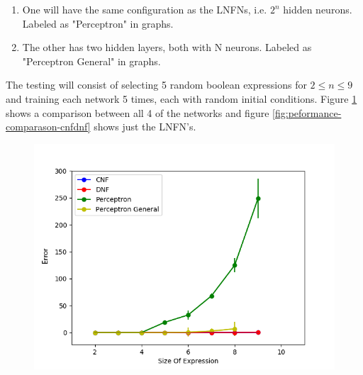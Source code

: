 \begin{enumerate}
	\item One will have the same configuration as the LNFNs, i.e. $2^n$ hidden neurons. Labeled as "Perceptron" in graphs.
	\item The other has two hidden layers, both with N neurons. Labeled as "Perceptron General" in graphs.
\end{enumerate}

The testing will consist of selecting 5 random boolean expressions for $2 \leq n \leq 9$ and training each network 5 times, each with random initial conditions. Figure \ref{fig:peformance-comparason-all} shows a comparison between all 4 of the networks and figure \ref{fig:peformance-comparason-cnfdnf} shows just the LNFN's.

\begin{figure}[H]
  \centering
  \begin{minipage}[b]{0.8\textwidth}
    \includegraphics[width=\textwidth]{All-Peformance-Comparason.png}
    \caption{}
    \label{fig:peformance-comparason-all}
  \end{minipage}
  \hfill
\end{figure}

